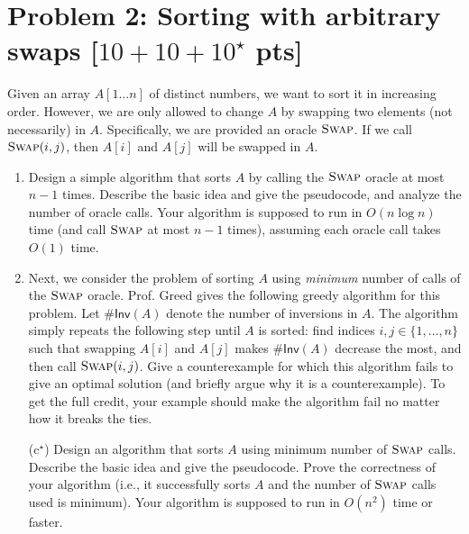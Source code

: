 \documentclass[11pt,twoside]{article}
\newcommand{\problem}[1]{\section*{Problem #1}}
\newenvironment{solution}{{\par\noindent\it Solution.}}{}
\begin{document}
\begin{solution}
\begin{lstlisting}[language=Python]
\end{lstlisting}

\end{solution}

\problem{2: Sorting with arbitrary swaps [$10+10+10^\star$ pts]}

Given an array $A[1 \dots n]$ of distinct numbers, we want to sort it in increasing order.
However, we are only allowed to change $A$ by swapping two elements (not necessarily) in $A$.
Specifically, we are provided an oracle $\textsc{Swap}$.
If we call $\textsc{Swap}(i,j)$, then $A[i]$ and $A[j]$ will be swapped in $A$.

\begin{enumerate}
    \item Design a simple algorithm that sorts $A$ by calling the $\textsc{Swap}$ oracle at most $n-1$ times.
    Describe the basic idea and give the pseudocode, and analyze the number of oracle calls.
    Your algorithm is supposed to run in $O(n \log n)$ time (and call $\textsc{Swap}$ at most $n-1$ times), assuming each oracle call takes $O(1)$ time.
    \item Next, we consider the problem of sorting $A$ using \textit{minimum} number of calls of the $\textsc{Swap}$ oracle.
    Prof. Greed gives the following greedy algorithm for this problem.
    Let $\#\mathsf{Inv}(A)$ denote the number of inversions in $A$.
    The algorithm simply repeats the following step until $A$ is sorted: find indices $i,j \in \{1,\dots,n\}$ such that swapping $A[i]$ and $A[j]$ makes $\#\mathsf{Inv}(A)$ decrease the most, and then call $\textsc{Swap}(i,j)$.
    Give a counterexample for which this algorithm fails to give an optimal solution (and briefly argue why it is a counterexample).
    To get the full credit, your example should make the algorithm fail no matter how it breaks the ties.
    \item[(c$^\star$)] Design an algorithm that sorts $A$ using minimum number of $\textsc{Swap}$ calls.
    Describe the basic idea and give the pseudocode.
    Prove the correctness of your algorithm (i.e., it successfully sorts $A$ and the number of $\textsc{Swap}$ calls used is minimum).
    Your algorithm is supposed to run in $O(n^2)$ time or faster.
\end{enumerate}
\end{document}

